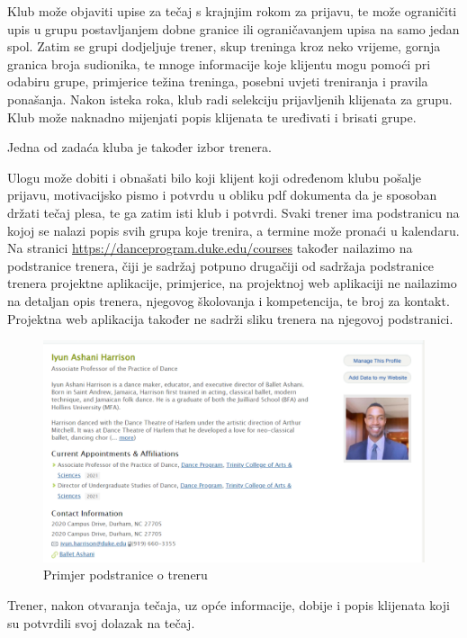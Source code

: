 Klub može objaviti upise za tečaj s krajnjim rokom za prijavu, te može ograničiti upis u grupu postavljanjem dobne granice ili ograničavanjem upisa na samo jedan spol. Zatim se grupi dodjeljuje trener, skup treninga kroz neko vrijeme, gornja granica broja sudionika, te mnoge informacije koje klijentu mogu pomoći pri odabiru grupe, primjerice težina treninga, posebni uvjeti treniranja i pravila ponašanja. Nakon isteka roka, klub radi selekciju prijavljenih klijenata za grupu. Klub može naknadno mijenjati popis klijenata te uređivati i brisati grupe.

Jedna od zadaća kluba je također izbor trenera.

Ulogu  može dobiti i obnašati bilo koji klijent koji određenom klubu pošalje prijavu, motivacijsko pismo i potvrdu u obliku pdf dokumenta da je sposoban držati tečaj plesa, te ga zatim isti klub i potvrdi. Svaki trener ima podstranicu na kojoj se nalazi popis svih grupa koje trenira, a termine može pronaći u kalendaru. Na stranici \url{https://danceprogram.duke.edu/courses} također nailazimo na podstranice trenera, čiji je sadržaj potpuno drugačiji od sadržaja podstranice trenera projektne aplikacije, primjerice, na projektnoj web aplikaciji ne nailazimo na detaljan opis trenera, njegovog školovanja i kompetencija, te broj za kontakt. Projektna web aplikacija također ne sadrži sliku trenera na njegovoj podstranici.

\begin{figure}[H]
	\centering
	\includegraphics[scale=0.3]{slike/opis_4.png}
	\caption{Primjer podstranice o treneru}
	\label{fig:screenshot004}
\end{figure}

Trener, nakon otvaranja tečaja, uz opće informacije, dobije i popis klijenata koji su potvrdili svoj dolazak na tečaj.

